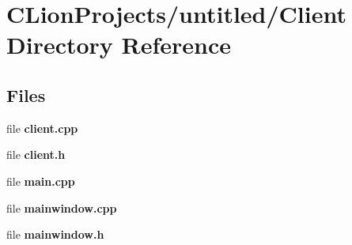 \section{C\+Lion\+Projects/untitled/\+Client Directory Reference}
\label{dir_4bed397f70ae7588fbaac13544ea9483}
\subsection*{Files}
\begin{DoxyCompactItemize}
\item 
file \textbf{ client.\+cpp}
\item 
file \textbf{ client.\+h}
\item 
file \textbf{ main.\+cpp}
\item 
file \textbf{ mainwindow.\+cpp}
\item 
file \textbf{ mainwindow.\+h}
\end{DoxyCompactItemize}
